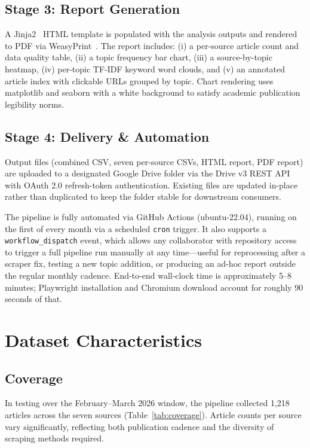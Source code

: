\documentclass[sigconf,anonymous]{acmart}
\begin{document}
\subsection{Stage 3: Report Generation}

A Jinja2~\cite{pallets2025jinja} HTML template is populated with the analysis
outputs and rendered to PDF via WeasyPrint~\cite{courtbouillon2021weasyprint}.
The report includes: (i) a per-source article count and data quality table,
(ii) a topic frequency bar chart, (iii) a source-by-topic heatmap,
(iv) per-topic TF-IDF keyword word clouds, and (v) an annotated article index
with clickable URLs grouped by topic.
Chart rendering uses matplotlib and seaborn with a white background to satisfy
academic publication legibility norms.

\subsection{Stage 4: Delivery \& Automation}

Output files (combined CSV, seven per-source CSVs, HTML report, PDF report) are
uploaded to a designated Google Drive folder via the Drive v3 REST API with
OAuth 2.0 refresh-token authentication.
Existing files are updated in-place rather than duplicated to keep the folder
stable for downstream consumers.

The pipeline is fully automated via GitHub Actions (ubuntu-22.04), running on
the first of every month via a scheduled \texttt{cron} trigger.
It also supports a \texttt{workflow\_dispatch} event, which allows any
collaborator with repository access to trigger a full pipeline run manually
at any time---useful for reprocessing after a scraper fix, testing a new topic
addition, or producing an ad-hoc report outside the regular monthly cadence.
End-to-end wall-clock time is approximately 5--8 minutes; Playwright
installation and Chromium download account for roughly 90 seconds of that.

\section{Dataset Characteristics}

\subsection{Coverage}

In testing over the February--March 2026 window, the pipeline collected
1,218 articles across the seven sources (Table~\ref{tab:coverage}).
Article counts per source vary significantly, reflecting both publication
cadence and the diversity of scraping methods required.
\end{document}
